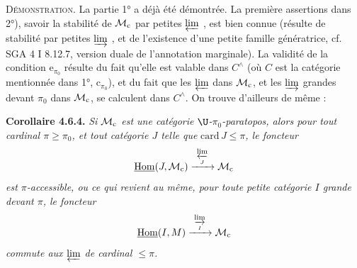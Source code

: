 
\textsc{Démonstration}. La partie 1° a déjà été démontrée. La première assertions dans 2°), savoir la stabilité de $\mathcal{M}_{\mathrm{c}}$ par petites $\varprojlim$ , est bien connue (résulte de stabilité par petites $\varinjlim$ , et de l'existence d'une petite famille génératrice, cf. SGA 4 I 8.12.7, version duale de l'annotation marginale). La validité de la condition $\mathrm{e}_{\pi_0}$ résulte du fait qu'elle est valable dans $C^{\wedge}$ (où $C$ est la catégorie mentionnée dans 1°, $\mathrm{c}_{\pi_0}$), et du fait que les $\varprojlim$ dans $\mathcal{M}_{\mathrm{c}}$, et les $\varinjlim$ grandes devant $\pi_0$ dans $\mathcal{M}_{\mathrm{c}}$, se calculent dans $C^{\wedge}$. On trouve d'ailleurs de même : %

\textbf{Corollaire 4.6.4.} \textit{Si $\mathcal{M}_{\mathrm{c}}$ est une catégorie $\U$-$\pi_0$-paratopos, alors pour tout cardinal $\pi \geqslant \pi_0$, et tout catégorie $J$ telle que} $\mathrm{card}\, J \leqslant \pi$\textit{, le foncteur} %
\[
\underline{\mathrm{Hom}}(J,\mathcal{M}_{\mathrm{c}}) \xrightarrow{\ \varprojlim\limits_{J}\ } \mathcal{M}_{\mathrm{c}}
\]
\textit{est $\pi$-accessible, ou ce qui revient au même, pour toute petite catégorie $I$ grande devant $\pi$, le foncteur}
\[
\underline{\mathrm{Hom}}(I,M) \xrightarrow{\ \varinjlim\limits_{I}\ } \Mc %
\]
\textit{commute aux $\varprojlim$ de cardinal $\leqslant \pi$.}


